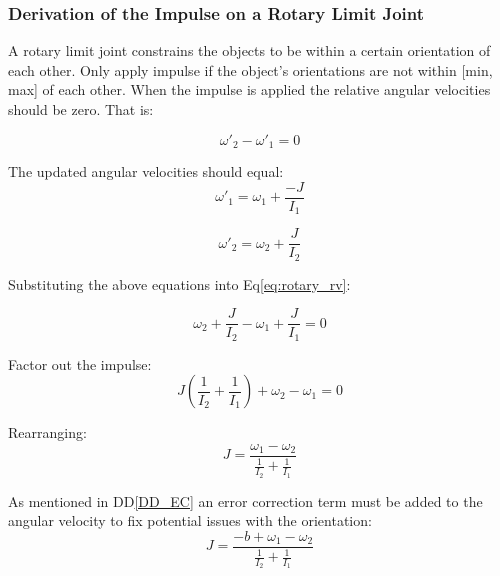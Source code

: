 \documentclass[12pt]{article}
\begin{document}
\subsubsection{Derivation of the Impulse on a Rotary Limit Joint}
A rotary limit joint constrains the objects to
be within a certain orientation of each other. Only apply impulse if the
object's
orientations are not within [min, max] of each other. When the impulse is 
applied the relative angular velocities should be zero. That is: 

\begin{equation}
\omega'_\text{2} -  \omega'_\text{1} = 0 \label{eq:rotary_rv}
\end{equation}


\noindent 
The updated angular velocities should equal:
\begin{equation*}
 \omega'_\text{1} =   \omega_\text{1} + \frac{-J}{I_\text{1}}
  \end{equation*}
  
\begin{equation*}
  \omega'_\text{2}  =  \omega_\text{2} +   \frac{J}{I_\text{2}}
  \end{equation*}


 \noindent 
 Substituting the above equations into Eq\ref{eq:rotary_rv}:
 
\begin{equation*}
   \omega_\text{2} +   \frac{J}{I_\text{2}} -
   \omega_\text{1} + \frac{J}{I_\text{1}} = 0
 \end{equation*}
 
 \noindent 
 Factor out the impulse:
\begin{equation*}
 J(\frac{1}{I_\text{2}} + \frac{1}{I_\text{1}}) +
   \omega_\text{2}  -
   \omega_\text{1} = 0
 \end{equation*}
 
 \noindent 
 Rearranging: 
 \begin{equation*}
 J = \frac{  \omega_\text{1}  -    \omega_\text{2} }
  {\frac{1}{I_\text{2}} + \frac{1}{I_\text{1}}}
 \end{equation*}
 
 
\noindent
As mentioned in DD\ref{DD_EC} an error correction term must be added to the
angular velocity to fix potential issues with the orientation:
\begin{equation*}
 J = \frac{ -b + \omega_\text{1}  -    \omega_\text{2} }
  {\frac{1}{I_\text{2}} + \frac{1}{I_\text{1}}}
\end{equation*}
\end{document}
